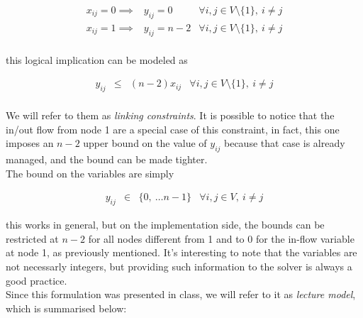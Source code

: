 \begin{equation*} 
    \begin{array}{rlrr} 
        x_{ij} = 0 \implies & y_{ij} = 0 & \forall i, j \in V \setminus \{1\},\ i \neq j \\
        x_{ij} = 1 \implies & y_{ij} = n - 2 & \forall i, j \in V \setminus \{1\},\ i \neq j \\
    \end{array} 
\end{equation*}

this logical implication can be modeled as

\begin{equation*} 
    \begin{array}{rrlr} 
        y_{ij} & \leq & (n - 2) x_{ij} & \forall i, j \in V \setminus \{1\},\ i \neq j \\
    \end{array} 
\end{equation*}

We will refer to them as \emph{linking constraints}. It is possible to notice
that the in/out flow from node 1 are a special case of this constraint, in
fact, this one imposes an $n - 2$ upper bound on the value of $y_{ij}$ because
that case is already managed, and the bound can be made tighter.\\
The bound on the variables are simply

\begin{equation*} 
    \begin{array}{rrlr} 
        y_{ij} & \in & \{0,\ \dots n-1\} & \forall i,j \in V,\ i \neq j
    \end{array} 
\end{equation*}

this works in general, but on the implementation side, the bounds can be
restricted at $n - 2$ for all nodes different from 1 and to $0$ for the in-flow
variable at node 1, as previously mentioned. It's interesting to note that the 
variables are not necessarly integers, but providing such information to the
solver is always a good practice.\\ 
Since this formulation was presented in class, we will refer to
it as \emph{lecture model}, which is summarised below:

